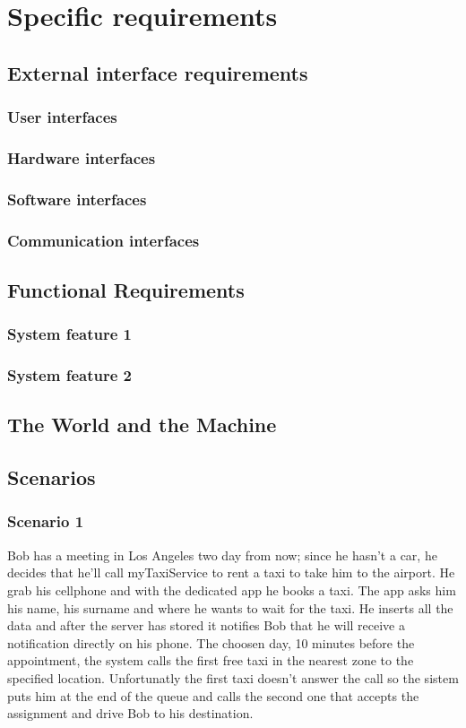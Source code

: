 \section{Specific requirements}
	\subsection{External interface requirements}
		\subsubsection{User interfaces}
		\subsubsection{Hardware interfaces}
		\subsubsection{Software interfaces}
		\subsubsection{Communication interfaces}
	\subsection{Functional Requirements}
		\subsubsection{System feature 1}
		\subsubsection{System feature 2}
	\subsection{The World and the Machine}
	\subsection{Scenarios}
		\subsubsection{Scenario 1}
		Bob has a meeting in Los Angeles two day from now; since he hasn't a car, he decides that he'll call myTaxiService to rent a taxi to take him to the airport. He grab his cellphone and with the dedicated app he books a taxi. The app asks him his name, his surname and where he wants to wait for the taxi. He inserts all the data and after the server has stored it notifies Bob that he will receive a notification directly on his phone. The choosen day, 10 minutes before the appointment, the system calls the first free taxi in the nearest zone to the specified location. Unfortunatly the first taxi doesn't answer the call so the sistem puts him at the end of the queue and calls the second one that accepts the assignment and drive Bob to his destination.
		
